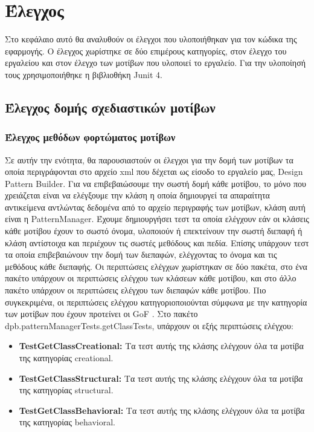 \chapter{Έλεγχος}
\label{ch:testing}
Στο κεφάλαιο αυτό θα αναλυθούν οι έλεγχοι που υλοποιήθηκαν για τον κώδικα της εφαρμογής. 
Ο έλεγχος χωρίστηκε σε δύο επιμέρους κατηγορίες, στον έλεγχο του εργαλείου και στον έλεγχο των μοτίβων που υλοποιεί το εργαλείο.
Για την υλοποίησή τους χρησιμοποιήθηκε η βιβλιοθήκη Junit 4.
\section{Έλεγχος δομής σχεδιαστικών μοτίβων}
\label{sec:patternTesting}
\subsection{Έλεγχος μεθόδων φορτώματος μοτίβων}
\label{subsec:patternManagerTesting}
Σε αυτήν την ενότητα, θα παρουσιαστούν οι έλεγχοι για την δομή των μοτίβων τα οποία περιγράφονται στο αρχείο xml που δέχεται ως είσοδο 
το εργαλείο μας, Design Pattern Builder.
Για να επιβεβαιώσουμε την σωστή δομή κάθε μοτίβου, το μόνο που χρειάζεται είναι να ελέγξουμε την κλάση η οποία δημιουργεί 
τα απαραίτητα αντικείμενα αντλώντας δεδομένα από το αρχείο περιγραφής των μοτίβων, κλάση αυτή είναι η PatternManager.
Έχουμε δημιουργήσει τεστ τα οποία ελέγχουν εάν οι κλάσεις κάθε μοτίβου έχουν το σωστό όνομα, υλοποιούν ή επεκτείνουν την σωστή 
διεπαφή ή κλάση αντίστοιχα και περιέχουν τις σωστές μεθόδους και πεδία. Επίσης υπάρχουν τεστ τα οποία επιβεβαιώνουν την δομή των 
διεπαφών, ελέγχοντας το όνομα και τις μεθόδους κάθε διεπαφής. Οι περιπτώσεις ελέγχων χωρίστηκαν σε δύο πακέτα, 
στο ένα πακέτο υπάρχουν οι περιπτώσεις ελέγχου των κλάσεων κάθε μοτίβου, και στο άλλο πακέτο υπάρχουν οι περιπτώσεις ελέγχου 
των διεπαφών κάθε μοτίβου. Πιο συγκεκριμένα, οι περιπτώσεις ελέγχου κατηγοριοποιούνται σύμφωνα με την 
κατηγορία των μοτίβων που έχουν προτείνει οι GoF \cite{GoF}. Στο πακέτο dpb.patternManagerTests.getClassTests, 
υπάρχουν οι εξής περιπτώσεις ελέγχου:
\begin{itemize}
    \item \textbf{TestGetClassCreational:} Τα τεστ αυτής της κλάσης ελέγχουν όλα τα μοτίβα της κατηγορίας creational.
    \item \textbf{TestGetClassStructural:} Τα τεστ αυτής της κλάσης ελέγχουν όλα τα μοτίβα της κατηγορίας structural.
    \item \textbf{TestGetClassBehavioral:} Τα τεστ αυτής της κλάσης ελέγχουν όλα τα μοτίβα της κατηγορίας behavioral.
\end{itemize}
